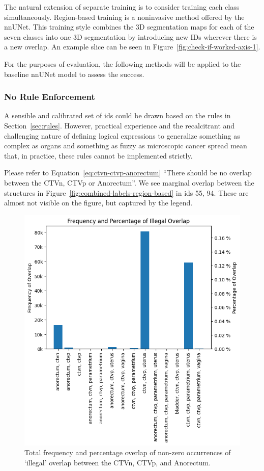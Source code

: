 \documentclass[12pt,twoside]{report}
\begin{document}
The natural extension of separate training is to consider training each class simultaneously. Region-based training is a noninvasive method offered by the nnUNet. This training style combines the 3D segmentation maps for each of the seven classes into one 3D segmentation by introducing new IDs wherever there is a new overlap. An example slice can be seen in Figure~\ref{fig:check-if-worked-axis-1}.

For the purposes of evaluation, the following methods will be applied to the baseline nnUNet model to assess the success.


\subsubsection{No Rule Enforcement}

A sensible and calibrated set of ids could be drawn based on the rules in Section~\ref{sec:rules}. However, practical experience and the recalcitrant and challenging nature of defining logical expressions to generalize something as complex as organs and something as fuzzy as microscopic cancer spread mean that, in practice, these rules cannot be implemented strictly.

Please refer to Equation~\ref{eq:ctvn-ctvp-anorectum} ``There should be no overlap between the CTVn, CTVp or Anorectum''. We see marginal overlap between the structures in Figure~\ref{fig:combined-labels-region-based} in ids 55, 94. These are almost not visible on the figure, but captured by the legend. 

\begin{figure}[H]
  \centering
  \includegraphics[width=.7\linewidth]{../figures/percentage_of_illegal_overlap.png}
  \caption{Total frequency and percentage overlap of non-zero occurrences of `illegal' overlap between the CTVn, CTVp, and Anorectum.}\label{fig:illegal_overlap}
\end{figure}
\end{document}
